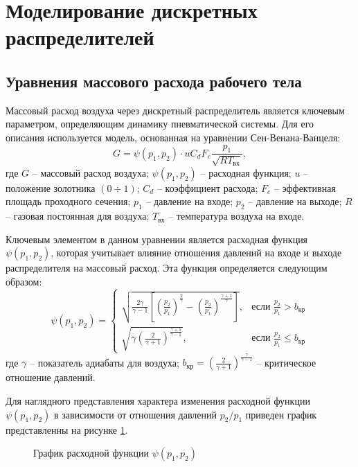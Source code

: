 \section{Моделирование дискретных распределителей}\label{sec:ch2/sec3}

\subsection{Уравнения массового расхода рабочего тела}\label{sec:ch2/sec3/subsec1}
Массовый расход воздуха через дискретный распределитель
является ключевым параметром, определяющим динамику пневматической
системы. Для его описания используется модель, основанная на уравнении Сен-Венана-Ванцеля:
\begin{equation}
    G = \psi(p_1, p_2) \cdot u C_d F_e \frac{p_1}{\sqrt{RT_\text{вх}}},
\end{equation}
где
$G$ -- массовый расход воздуха;
$\psi(p_1, p_2)$ -- расходная функция;
$u$ -- положение золотника $(0 \div 1)$;
$C_d$ -- коэффициент расхода;
$F_e$ -- эффективная площадь проходного сечения;
$p_1$ -- давление на входе;
$p_2$ -- давление на выходе;
$R$ -- газовая постоянная для воздуха;
$T_\text{вх}$ -- температура воздуха на входе.

Ключевым элементом в данном уравнении является расходная функция $\psi(p_1, p_2)$, которая
учитывает влияние отношения давлений на входе и выходе распределителя
на массовый расход. Эта функция определяется следующим образом:
\begin{equation*}
    \psi(p_1, p_2) = \begin{cases}
        \sqrt{\frac{2\gamma}{\gamma-1}\left[\left(\frac{p_2}{p_1}\right)^{\frac{2}{\gamma}} - \left(\frac{p_2}{p_1}\right)^{\frac{\gamma+1}{\gamma}}\right]}, & \text{если } \frac{p_2}{p_1} > b_{кр}    \\
        \sqrt{\gamma \left(\frac{2}{\gamma+1}\right)^{\frac{\gamma+1}{\gamma-1}}},                                                                            & \text{если } \frac{p_2}{p_1} \leq b_{кр}
    \end{cases}
\end{equation*}
где
$\gamma$ -- показатель адиабаты для воздуха;
$b_{кр} = \left(\frac{2}{\gamma+1}\right)^{\frac{\gamma}{\gamma-1}}$ -- критическое отношение давлений.

Для наглядного представления характера изменения расходной функции
$\psi(p_1, p_2)$ в зависимости от отношения давлений $p_2/p_1$
приведен график представленны на рисунке \ref{fig:ch2/mass_flow_function}.
\begin{figure}
    \caption{График расходной функции $\psi(p_1, p_2)$}
    \label{fig:ch2/mass_flow_function}
\end{figure}

